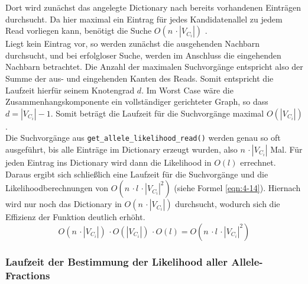 Dort wird zunächst das angelegte Dictionary nach bereits vorhandenen Einträgen durchsucht. Da hier maximal ein Eintrag für jedes Kandidatenallel zu jedem Read vorliegen kann, benötigt die Suche $ O(n \,\cdotp |V_{C_{i}}|) $ \cite{python-sort}. \\

Liegt kein Eintrag vor, so werden zunächst die ausgehenden Nachbarn durchsucht, und bei erfolgloser Suche, werden im Anschluss die eingehenden Nachbarn betrachtet. Die Anzahl der maximalen Suchvorgänge entspricht also der Summe der aus- und eingehenden Kanten des Reads. Somit entspricht die Laufzeit hierfür seinem Knotengrad $d$. Im Worst Case wäre die Zusammenhangskomponente ein vollständiger gerichteter Graph, so dass $ d = |V_{C_{i}}| - 1 $. Somit beträgt die Laufzeit für die Suchvorgänge maximal $O(|V_{C_{i}}|)$.\\

Die Suchvorgänge aus \lstinline|get_allele_likelihood_read()| werden genau so oft ausgeführt, bis alle Einträge im Dictionary erzeugt wurden, also $n \,\cdotp |V_{C_{i}}|$ Mal. Für jeden Eintrag ins Dictionary wird dann die Likelihood in $ O(l) $ errechnet. Daraus ergibt sich schließlich eine Laufzeit für die Suchvorgänge und die Likelihoodberechnungen von $ O(n \,\cdotp l \,\cdotp |V_{C_{i}}|^2)$ (siehe Formel \eqref{eqn:4-14}). Hiernach wird nur noch das Dictionary in $ O(n \,\cdotp |V_{C_{i}}|) $ durchsucht, wodurch sich die Effizienz der Funktion deutlich erhöht.
\begin{equation} \label{eqn:4-14}
\tag{4-14}
O(n \,\cdotp |V_{C_{i}}|) \,\cdotp O(|V_{C_{i}}|) \,\cdotp O(l) = O(n \,\cdotp l \,\cdotp |V_{C_{i}}|^2)
\end{equation}

\subsubsection{Laufzeit der Bestimmung der Likelihood aller Allele-Fractions} 


